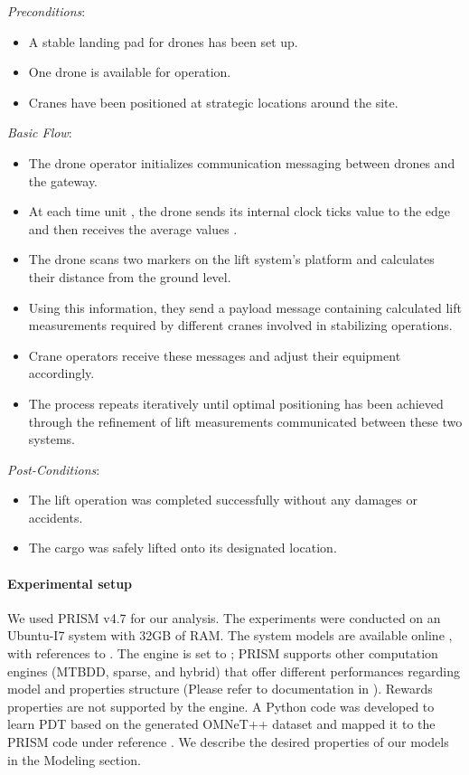 \emph{Preconditions}:
\begin{itemize}
    \item A stable landing pad for drones has been set up.
    \item One drone is available for operation.
    \item Cranes have been positioned at strategic locations around the site.
\end{itemize}
    
\emph{Basic Flow}:
\begin{itemize}
    \item  {} The drone operator initializes communication messaging between drones and the gateway.
    \item At each time unit , the drone sends its internal clock ticks value to the edge and then receives the average values .    
    \item The drone scans two markers on the lift system's platform and calculates their distance from the ground level.
    \item Using this information,  they send a payload message containing calculated lift measurements required by different cranes involved in stabilizing operations. 
    \item Crane operators receive these messages and adjust their equipment accordingly. 
     \item The process repeats iteratively until optimal positioning has been achieved through the refinement of lift measurements communicated between these two systems.
\end{itemize}
\emph{Post-Conditions}: 
\begin{itemize}
\item The lift operation was completed successfully without any damages or accidents. 
\item The cargo was safely lifted onto its designated location.
\end{itemize}

\paragraph{Experimental setup}
We used PRISM v4.7 for our analysis.  The experiments were conducted on an Ubuntu-I7 system with 32GB of RAM. The system models are available online \cite{csi2023}, with references   to . The engine is set to ; PRISM supports other computation engines (MTBDD, sparse, and hybrid) that offer different performances regarding model and properties structure (Please refer to documentation in \cite{prism-engines}). Rewards properties are not supported by the  engine. A Python code was developed to learn PDT based on the generated OMNeT++ dataset and mapped it to the PRISM code under reference . We describe the desired properties of our models in the Modeling section.

